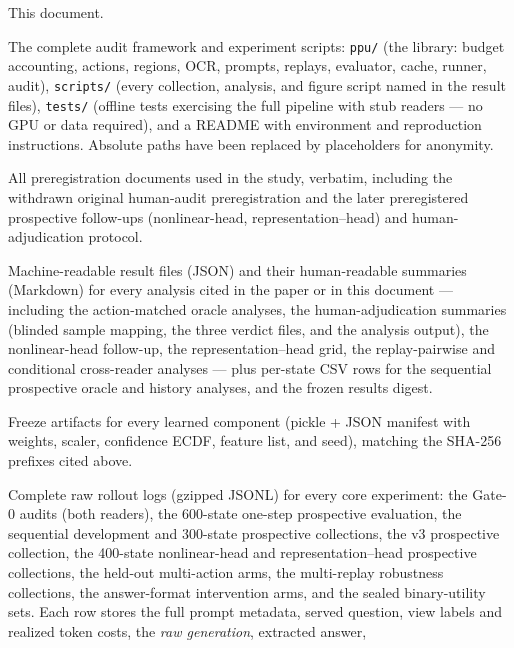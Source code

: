 \documentclass[10pt]{article}
\begin{document}
\begin{description}[style=nextline]
\item[\texttt{supplementary.pdf}] This document.
\item[\texttt{code/}] The complete audit framework and experiment scripts:
  \texttt{ppu/} (the library: budget accounting, actions, regions, OCR,
  prompts, replays, evaluator, cache, runner, audit), \texttt{scripts/}
  (every collection, analysis, and figure script named in the result
  files), \texttt{tests/} (offline tests exercising the full pipeline with
  stub readers --- no GPU or data required), and a README with environment
  and reproduction instructions. Absolute paths have been replaced by
  placeholders for anonymity.
\item[\texttt{preregistrations/}] All preregistration documents used in
  the study, verbatim, including the withdrawn original human-audit
  preregistration and the later preregistered prospective follow-ups
  (nonlinear-head, representation--head) and human-adjudication protocol.
\item[\texttt{results/}] Machine-readable result files (JSON) and their
  human-readable summaries (Markdown) for every analysis cited in the
  paper or in this document --- including the action-matched oracle
  analyses, the human-adjudication summaries (blinded sample mapping, the
  three verdict files, and the analysis output), the nonlinear-head
  follow-up, the representation--head grid, the replay-pairwise and
  conditional cross-reader analyses --- plus per-state CSV rows for the
  sequential prospective oracle and history analyses, and the frozen
  results digest.
\item[\texttt{models/}] Freeze artifacts for every learned component
  (pickle + JSON manifest with weights, scaler, confidence ECDF, feature
  list, and seed), matching the SHA-256 prefixes cited above.
\item[\texttt{logs/}] Complete raw rollout logs (gzipped JSONL) for every
  core experiment: the Gate-0 audits (both readers), the 600-state one-step
  prospective evaluation, the sequential development and 300-state
  prospective collections, the v3 prospective collection, the 400-state
  nonlinear-head and representation--head prospective collections, the
  held-out multi-action arms, the multi-replay robustness collections, the
  answer-format intervention arms, and the sealed binary-utility sets.
  Each row stores the full prompt metadata, served question, view labels
  and realized token costs, the \emph{raw generation}, extracted answer,

\end{description}
\end{document}
